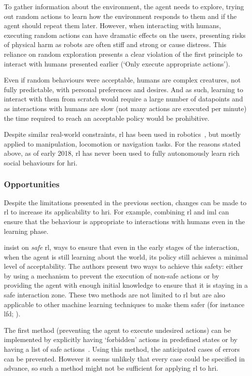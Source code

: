 To gather information about the environment, the agent needs to explore, trying out random actions to learn how the environment responds to them and if the agent should repeat them later. However, when interacting with humans, executing random actions can have dramatic effects on the users, presenting risks of physical harm as robots are often stiff and strong or cause distress. This reliance on random exploration presents a clear violation of the first principle to interact with humans presented earlier (`Only execute appropriate actions').

Even if random behaviours were acceptable, humans are complex creatures, not fully predictable, with personal preferences and desires. And as such, learning to interact with them from scratch would require a large number of datapoints and as interactions with humans are slow (not many actions are executed per minute) the time required to reach an acceptable policy would be prohibitive. 

Despite similar real-world constraints, \gls{rl} has been used in robotics~\citep{kober2013reinforcement}, but mostly applied to manipulation, locomotion or navigation tasks. For the reasons stated above, as of early 2018, \gls{rl} has never been used to fully autonomously learn rich social behaviours for \gls{hri}. 

\subsubsection{Opportunities}  
Despite the limitations presented in the previous section, changes can be made to \gls{rl} to increase its applicability to \gls{hri}. For example, combining \gls{rl} and \gls{iml} can ensure that the behaviour is appropriate to interactions with humans even in the learning phase.

\cite{garcia2015comprehensive} insist on \textit{safe} \gls{rl}, ways to ensure that even in the early stages of the interaction, when the agent is still learning about the world, its policy still achieves a minimal level of acceptability. The authors present two ways to achieve this safety: either by using a mechanism to prevent the execution of non-safe actions or by providing the agent with enough initial knowledge to ensure that it is staying in a safe interaction zone. These two methods are not limited to \gls{rl} but are also applicable to other machine learning techniques to make them safer (for instance \gls{lfd}; \citealt{billard2008robot}). 

The first method (preventing the agent to execute undesired actions) can be implemented by explicitly having `forbidden' actions in predefined states or by having a list of safe actions~\citep{alshiekh2017safe}. Using this method, the anticipated cases of errors can be prevented. However it seems unlikely that every case could be specified in advance, so such a method might not be sufficient for applying \gls{rl} to \gls{hri}. 

